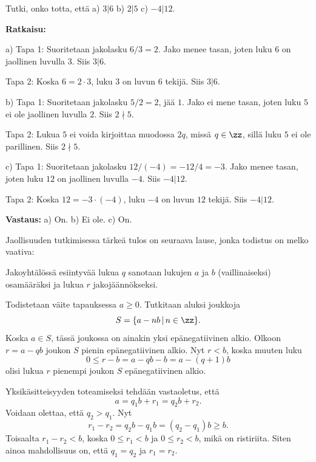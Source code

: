\begin{esimerkki}
 Tutki, onko totta, että a)  $3 | 6$  b)  $2 | 5$ c) $-4|12$.

{\bf Ratkaisu:}

a) Tapa 1: Suoritetaan jakolasku $6/3= 2$. Jako menee tasan, joten luku $6$ on jaollinen luvulla $3$. Siis $3 | 6$.

Tapa 2: Koska $6 = 2 \cdot 3$, luku $3$ on luvun $6$ tekijä. Siis $3 | 6$.

b) Tapa 1: Suoritetaan jakolasku $5/2 = 2$, jää $1$. Jako ei mene tasan, joten luku $5$ ei ole jaollinen luvulla $2$. Siis $2 \nmid 5$.

Tapa 2: Lukua $5$ ei voida kirjoittaa muodossa $2q$, missä $q\in\zz$, sillä luku $5$ ei ole parillinen. Siis $2 \nmid 5$.

c) 
Tapa 1: Suoritetaan jakolasku $12/(-4)=-12/4= -3$. Jako menee tasan, joten luku $12$ on jaollinen luvulla $-4$. Siis $-4 | 12$.

Tapa 2: Koska $12 = -3 \cdot (-4)$, luku $-4$ on luvun $12$ tekijä. Siis $-4 | 12$.

{\bf Vastaus:} a) On.  b) Ei ole. c) On.
\end{esimerkki}

Jaollisuuden tutkimisessa tärkeä tulos on seuraava lause, jonka todistus on melko vaativa:


Jakoyhtälössä esiintyvää lukua $q$ sanotaan lukujen $a$ ja $b$ (vaillinaiseksi) osamääräksi ja lukua $r$  jakojäännökseksi.


\begin{todistus}%
Todistetaan väite tapauksessa $a\ge 0$. Tutkitaan aluksi joukkoja
\[
S = \{ a-nb\,|\, n\in \zz\}.
\]
Koska $a\in S$, tässä joukossa on ainakin yksi epänegatiivinen alkio. Olkoon $r=a-qb$ joukon $S$ pienin epänegatiivinen alkio. Nyt $r < b$, koska muuten luku 
\[
0\le r - b = a - qb - b = a - (q+1)b 
\]
olisi lukua $r$ pienempi joukon $S$ epänegatiivinen alkio.

Yksikäsitteisyyden toteamiseksi tehdään vastaoletus, että
\[
a= q_1b+r_1 = q_2b+r_2.
\]
Voidaan olettaa, että $q_2>q_1$. Nyt
\[
r_1 - r_2 = q_2b - q_1b = (q_2-q_1)b \ge b.
\]
Toisaalta $r_1-r_2<b$, koska $0\le r_1 < b$ ja $0\le r_2 < b$, mikä on ristiriita. Siten ainoa mahdollisuus on, että $q_1=q_2$ ja $r_1=r_2$.
\end{todistus}

